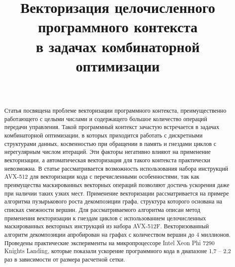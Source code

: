 \documentclass[
11pt,%
tightenlines,%
twoside,%
onecolumn,%
nofloats,%
nobibnotes,%
nofootinbib,%
superscriptaddress,%
noshowpacs,%
centertags]%
{revtex4}
\begin{document}

\title{Векторизация целочисленного программного контекста \\ в задачах комбинаторной оптимизации}

\author{~}




\begin{abstract} %
Статья посвящена проблеме векторизации программного контекста, преимущественно работающего с целыми числами и содержащего большое количество операций передачи управления.
Такой программный контекст зачастую встречается в задачах комбинаторной оптимизации, в которых приходится работать с дискретными структурами данных, косвенностью при обращении в память и гнездами циклов с нерегулярным числом итераций.
Эти факторы негативно влияют на применение векторизации, а автоматическая векторизация для такого контекста практически невозможна.
В статье рассматривается возможность использования набора инструкций AVX-512 для векторизации кода с перечисленными особенностями, так как преимущества маскированных векторных операций позволяют достичь ускорения даже при наличии таких узких мест.
Применение векторизации рассматривается на примере алгоритма пузырькового роста декомпозиции графа, структура которого основана на списках смежности вершин.
Для рассматриваемого алгоритма описан метод применения векторизации к гнездам циклов с использованием целочисленных маскированных векторных инструкций из набора AVX-512F.
Векторизованный алгоритм декомпозиции апробирован на графах с количеством вершин до 4 миллионов.
Проведены практические эксперименты на микропроцессоре Intel Xeon Phi 7290 Knights Landing, которые показали ускорение программного кода в диапазоне 1,7 -- 2,2 раз в зависимости от размера расчетной сетки.
\end{abstract}
\end{document}

